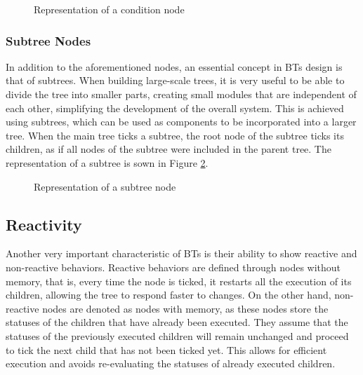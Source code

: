\begin{figure}[!h]
    \centering
    \scalebox{.9} {
        \begin{forest}
        \end{forest}
    }
    \caption{Representation of a condition node}
    \label{fig:background_condition_node}
\end{figure}

\subsubsection{Subtree Nodes}

In addition to the aforementioned nodes, an essential concept in BTs design is that of subtrees. When building large-scale trees, it is very useful to be able to divide the tree into smaller parts, creating small modules that are independent of each other, simplifying the development of the overall system. This is achieved using subtrees, which can be used as components to be incorporated into a larger tree. When the main tree ticks a subtree, the root node of the subtree ticks its children, as if all nodes of the subtree were included in the parent tree. The representation of a subtree is sown in Figure \ref{fig:background_subtree_node}.

\begin{figure}[!h]
    \centering
    \scalebox{.9} {
        \begin{forest}
        \end{forest}
    }
    \caption{Representation of a subtree node}
    \label{fig:background_subtree_node}
\end{figure}

\subsection{Reactivity}

Another very important characteristic of BTs is their ability to show reactive and non-reactive behaviors. Reactive behaviors are defined through nodes without memory, that is, every time the node is ticked, it restarts all the execution of its children, allowing the tree to respond faster to changes. On the other hand, non-reactive nodes are denoted as nodes with memory, as these nodes store the statuses of the children that have already been executed. They assume that the statuses of the previously executed children will remain unchanged and proceed to tick the next child that has not been ticked yet. This allows for efficient execution and avoids re-evaluating the statuses of already executed children.

